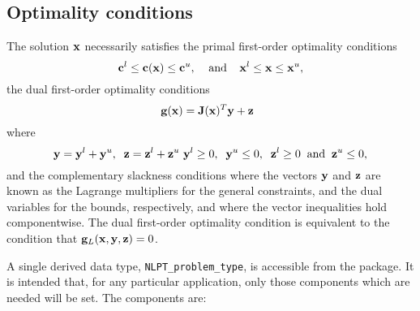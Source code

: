 \documentclass{galahad}
\newcommand{\packagename}{NLPT}
\begin{document}

\subsection{Optimality conditions\label{galopt}}

The solution ${\mathbf{x}}$ necessarily satisfies
the primal first-order optimality conditions
\[
{\mathbf{c}}^l \leq {\mathbf{c}}({\mathbf{x}}) \leq {\mathbf{c}}^u,
\;\;\;\; \mbox{and} \;\;\;\;
{\mathbf{x}}^l \leq {\mathbf{x}} \leq {\mathbf{x}}^u,
\]
the dual first-order optimality conditions
\[
{\mathbf{g}}( {\mathbf{x}} ) = {\mathbf{J}}({\mathbf{x}})^{T} {\mathbf{y}} + {\mathbf{z}} \;\;
\]
where
\[
{\mathbf{y}} = {\mathbf{y}}^{l} + {\mathbf{y}}^{u}, \;\;
 {\mathbf{z}} = {\mathbf{z}}^{l} + {\mathbf{z}}^{u}\,\,
 {\mathbf{y}}^{l} \geq 0 , \;\;
 {\mathbf{y}}^{u} \leq 0 , \;\;
 {\mathbf{z}}^{l} \geq 0 \;\; \mbox{and} \;\;
 {\mathbf{z}}^{u} \leq 0 ,
\]
and the complementary slackness conditions
where the vectors ${\mathbf{y}}$ and ${\mathbf{z}}$ are
known as the Lagrange multipliers for
the general constraints, and the dual variables for the bounds,
respectively, and where the vector inequalities hold componentwise.
The dual first-order optimality condition is equivalent to
the condition that ${\mathbf{g}}_L( {\mathbf{x}},{\mathbf{y}}, {\mathbf{z}}) = 0$.


\galtype
A single derived data type, {\tt \packagename\_problem\_type},
is accessible from the package. It is intended that, for any particular
application, only those components which are needed will be set.
The components are:
\end{document}

